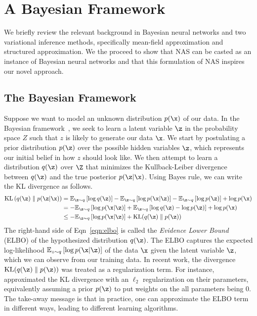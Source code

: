 \section{\label{sec:bayes}A Bayesian Framework}

We briefly review the relevant background in Bayesian neural networks and two
variational inference methods, specifically mean-field approximation and
structured approximation. We the proceed to show that NAS can be casted as an
instance of Bayesian neural networks and that this formulation of NAS inspires
our novel approach.

\subsection{\label{sec:bayesian}The Bayesian Framework}
Suppose we want to model an unknown distribution $p(\x)$ of our data. In the
Bayesian framework~\citep{bayes_nn}, we seek to learn a latent variable $\z$ in
the probability space $Z$ such that $z$ is likely to generate our data $\x$. We
start by postulating a prior distribution $p(\z)$ over the possible hidden
variables $\z$, which represents our initial belief in how $z$ should look
like. We then attempt to learn a distribution $q(\z)$ over $\Z$ that minimizes
the Kullback-Leiber divergence between $q(\z)$ and the true posterior $p(\z |
\x)$. Using Bayes rule, we can write the KL divergence as follows.
\begin{align}
  \text{KL}\left( q(\z) \parallel p(\z | \x) \right)
    &= \mathbb{E}_{\z \sim q} \left[ \log{q(\z)} \right]
     - \mathbb{E}_{\z \sim q} \left[ \log{p(\x | \z)} \right]
     - \mathbb{E}_{\z \sim q} \left[ \log{p(\z)} \right] + \log{p(\x)} \\
    &= -\mathbb{E}_{\z \sim q} \left[ \log{p(\x | \z)} \right]
     + \mathbb{E}_{\z \sim q}\left[ \log{q(\z)} - \log{p(\z)} \right] + \log{p(\x)} \\
    \label{eqn:elbo}
    &\leq -\mathbb{E}_{\z \sim q} \left[ \log{p(\x | \z)} \right] + \text{KL}(q(\z) \parallel p(\z))
\end{align}
The right-hand side of Eqn~\ref{eqn:elbo} is called the \textit{Evidence Lower
Bound} (ELBO) of the hypothesized distribution $q(\z)$. The ELBO captures the
expected log-likelihood $\mathbb{E}_{z \sim q} \left[ \log{p(\x | \z)} \right]$
of the data $\x$ given the latent variable $\z$, which we can observe from our
training data. In recent work, the divergence $\text{KL}(q(\z) \parallel
p(\z))$ was treated as a regularization term. For
instance,~\cite{variational_dropout,variational_dropout_rnn} approximated the
KL divergence with an $\ell_2$ regularization on their parameters, equivalently
assuming a prior $p(\z)$ to put weights on the all parameters being $0$. The
take-away message is that in practice, one can approximate the ELBO term in
different ways, leading to different learning algorithms.

